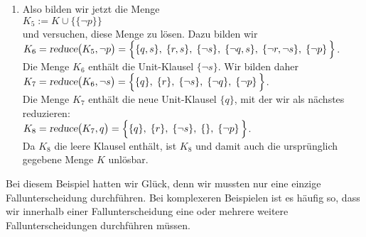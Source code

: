 \begin{enumerate}
\item Also bilden wir jetzt die Menge \\[0.2cm]
      \hspace*{1.3cm} $K_5 := K \cup \bigl\{ \{\neg p\} \bigr\}$ \\[0.2cm]
      und versuchen, diese Menge zu lösen.  Dazu bilden wir
      \\[0.2cm]
      \hspace*{1.3cm} 
      $K_6 = \textsl{reduce}\bigl(K_5, \neg p\bigr) =\Big\{ \{q, s\},\; \{r, s\},\;\{\neg s\},\; \{\neg q, s\},\; \{\neg r, \neg s\},\;\{\neg p\}\, \Big\}$.
      \\[0.2cm]
      Die Menge $K_6$ enthält die  Unit-Klausel $\{\neg s\}$.  Wir bilden daher \\[0.2cm]
      \hspace*{1.3cm} 
      $K_7 = \textsl{reduce}\bigl(K_6, \neg s\bigr) =\Big\{ \{q\},\; \{r\},\;\{\neg s\},\; \{\neg q\},\;\{\neg p\}\, \Big\}$.
      \\[0.2cm]
      Die Menge $K_7$ enthält die neue Unit-Klausel $\{q\}$, mit der wir als nächstes reduzieren:\\[0.2cm]
      \hspace*{1.3cm} 
      $K_8 = \textsl{reduce}\bigl(K_7, q \bigr) =\Big\{ \{q\},\; \{r\},\;\{\neg s\},\; \{\},\;\{\neg p\}\, \Big\}$.
      \\[0.2cm]
      Da $K_8$ die leere Klausel enthält, ist $K_8$ und damit auch die ursprünglich
      gegebene Menge $K$ unlösbar.
\end{enumerate}
Bei diesem Beispiel hatten wir Glück, denn wir mussten nur eine einzige Fallunterscheidung
durchführen. Bei komplexeren Beispielen ist es häufig so, dass wir innerhalb einer Fallunterscheidung eine
oder mehrere weitere Fallunterscheidungen durchführen müssen.

